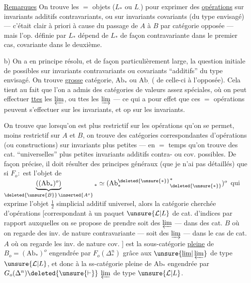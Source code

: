 \uline{Remarques}  On trouve 
les $=$ objets ($L_*$ ou $L_\cdot$) pour exprimer
des \uline{opérations} sur invariants additifs
contravariants, ou sur invariants  covariants
(du type envisagé) --- c'était
clair à priori à cause du passage
de $A$ à $B$ par  catégorie opposée
--- mais l'op. définie par $L_*$ dépend
de $L_*$ de façon contravariante dans le
premier cas, covariante dans le deuxième.

b) On a en principe résolu, et de façon
particulièrement large, la question initiale
de  possibles sur
invariants contravariants ou covariants
``additifs'' du type envisagé. On trouve 
\inserted{$\unsure{=}$} \uline{grosse} catégorie, $\mathrm{Ab}_*$ ou $\mathrm{Ab}_\cdot$ (
 de celle-ci à l'opposée). Cela
tient au fait que l'on a admis
des catégories  de valeurs  assez spéciales,
 où on peut effectuer \uline{ttes}
les $\varprojlim$, ou ttes les $\varinjlim$ --- ce
qui a pour effet que ces $=$ opérations
peuvent s'effectuer sur les 
invariants, et op sur les invariants.

On trouve que lorsqu'on est plus
restrictif sur les opérations qu'on
se permet,  moins restrictif
sur $A$ et $B$, on trouve des catégories
correspondantes d'opérations (ou constructions)
sur invariants plus petites --- 
en $=$ temps qu'on trouve des cat.
``universelles'' plus petites 
invariants additifs contra- ou cov.
possibles. \unsure{\&} De façon précise, il doit
résulter des principes généraux (que je
n'ai pas détaillés) que si  $F_o:$ \deleted{$\unsure{\widehat{\boldsymbol\Delta}}$}
est l'objet de
$\underbrace{((\mathrm{Ab}_*)^o)}_{\deleted{\unsure{B}}\,\inserted{A^o}}{}_*
\simeq({\mathrm{Ab}^{\deleted{\unsure{*}}}_*}^{*}_{\deleted{\unsure{*}}})^o$
qui exprime l'objet $\frac12$ simplicial
additif universel, alors la  catégorie
cherchée d'opérations [correspondant à
un paquet $\unsure{\mathcal L|L}$ de cat. d'indices par
rapport auxquelles on se propose de
prendre soit des $\varprojlim$ --- dans des cat.
$B$ où on regarde des inv. de nature
contravariante --- soit des $\varinjlim$ --- dans
le cas de cat. $A$ où on regarde les inv. de
nature cov. ] est la sous-catégorie \uline{pleine}
de $B_o=(\mathrm{Ab}_*)^o$ engendrée par $F_o(\Delta_*^n)$ grâce
aux $\unsure{\underline{\lim}|\varprojlim}$ de type $\unsure{\mathcal L|L}$, et 
donc à la ss-catégorie pleine de $\mathrm{Ab}_*$
engendrée par  $G_o(\Delta^n)\deleted{\unsure{\vdash}}$  $\varprojlim$ de type $\unsure{\mathcal L|L}$.
